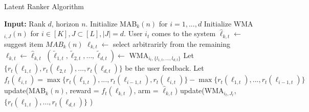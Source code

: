 

\begin{algorithm}
\caption{Latent Ranker Algorithm}
\label{alg:latent-rank}
  \begin{algorithmic}[1]
  \State \textbf{Input:} Rank $d$, horizon $n$.
  \State Initialize MAB$_k(n)$ for $i=1,...,d$
  \State Initialize WMA$_{i,J}(n)$ for $i \in [K], J \subset [L], |J| = d.$
      \State User $i_t$ comes to the system
      \State $\hat{{\ell}}_{k,t} \leftarrow$ suggest item $MAB_k(n)$
      \State ${\ell}_{k,t} \leftarrow$ select arbitrarirly from the remaining
      \Else
      \State $\ell_{k,t} \leftarrow \hat{\ell}_{k,t}$
      \EndIf
      \EndFor
      \State $(\tilde{\ell}_{1,t},\tilde{\ell}_{2,t},\dots,\tilde{\ell}_{d,t} )\leftarrow$ WMA$_{i_t,\{ l_{1,t},...,l_{d,t} \} }$ %
      \State Let  $\{ r_{t}(\ell_{1,t}), r_{t}(\ell_{2,t}),\dots,r_{t}(\ell_{d,t}) \}$ be the user feedback.
      \State Let $f_t(\ell_{i,t}) = \max \{ r_t(\ell_{1,t}),...,r_t(\ell_{i-1,t}),r_t({\ell}_{i,t}) \} - \max \{ r_t(\ell_{1,t}),...,r_t(\ell_{i-1,t}) \}$ 
      \State update(MAB$_{k}(n)$, reward = $f_t(\ell_{k,t})$, arm = $\hat{\ell}_{k,t}$)
      \State update(WMA$_{i_t,J_t}$,$\{ r_t(\ell_{1,t}),...,r_t(\ell_{d,t})\}$ )
    \EndFor
  \end{algorithmic}
\end{algorithm}

